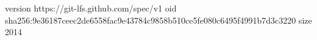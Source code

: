 version https://git-lfs.github.com/spec/v1
oid sha256:9e36187ceec2de6558fac9e43784c9858b510ce5fe080c6495f4991b7d3c3220
size 2014

